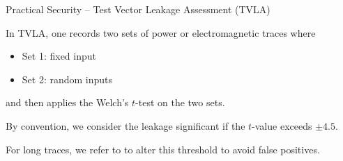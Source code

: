 \fi
%
%
%



\begin{frame}{Practical Security – Test Vector Leakage Assessment (TVLA)}

%
%
%

\medskip
In TVLA, one records two sets of power or electromagnetic traces where
\pause

\begin{itemize}
	\item Set 1: fixed input
	\pause
	\item Set 2: random inputs
\end{itemize}
\pause

and then applies the Welch's $t$-test on the two sets.
\pause
\medskip

By convention, we consider the leakage significant if the $t$-value exceeds $\pm 4.5$.
\pause
\medskip

For long traces, we refer to \cite{ding2018towards} to alter this threshold to avoid false positives.

\end{frame}

%
%
%

